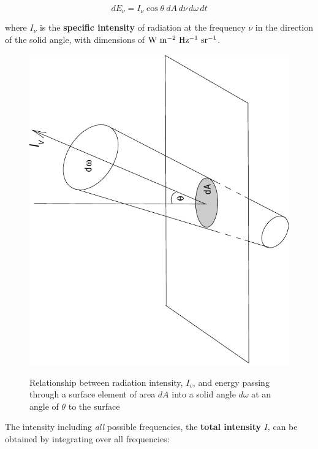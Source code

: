 \documentclass[twoside,11pt]{article}
\begin{document}
\begin{equation}
dE_{\nu} = I_{\nu} \cos \theta\: dA\, d\nu\, d\omega\, dt
\end{equation}

where $I_\nu$ is the {\bf specific intensity} of radiation at the
frequency $\nu$ in the direction of the solid angle, with dimensions
of ${\rm W~m^{-2}~Hz^{-1}~sr^{-1}}$.

\begin{figure}[htbp]
   \centering
   \includegraphics[totalheight=5in,angle=270]{sc6_intensity}
   \begin{quote}
   \caption{Relationship between radiation intensity, $I_v$, and energy
    passing through a surface element of area $dA$ into a solid angle
    $d\omega$ at an angle of $\theta$ to the surface
   \label{INTENSITY} }
   \end{quote}
\end{figure}

The intensity including {\it all} possible frequencies, the {\bf total
intensity} $I$, can be obtained by integrating over all frequencies:
\end{document}
